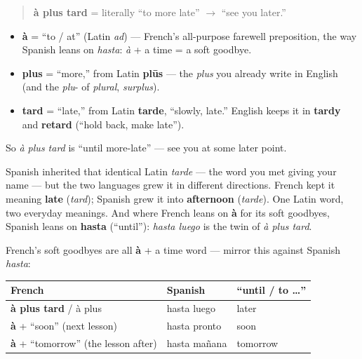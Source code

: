 \begin{cousinweb}
\begin{quote}
\textbf{à plus tard} = literally \textquotedblleft{}to more late\textquotedblright{} $\to$ \textquotedblleft{}see you later.\textquotedblright{}
\end{quote}

\begin{itemize}
\raggedright
  \item \textbf{à} = \textquotedblleft{}to / at\textquotedblright{} (Latin \emph{ad}) — French's all-purpose farewell preposition, the way Spanish leans on \emph{hasta}: \emph{à} + a time = a soft goodbye.
  \item \textbf{plus} = \textquotedblleft{}more,\textquotedblright{} from Latin \textbf{plūs} — the \emph{plus} you already write in English (and the \emph{plu}- of \emph{plural}, \emph{surplus}).
  \item \textbf{tard} = \textquotedblleft{}late,\textquotedblright{} from Latin \textbf{tarde}, \textquotedblleft{}slowly, late.\textquotedblright{} English keeps it in \textbf{tardy} and \textbf{retard} (\textquotedblleft{}hold back, make late\textquotedblright{}).
\end{itemize}

So \emph{à plus tard} is \textquotedblleft{}until more-late\textquotedblright{} — see you at some later point.
\end{cousinweb}

\begin{culture}
Spanish inherited that identical Latin \emph{tarde} — the word you met giving your name — but the two languages grew it in different directions. French kept it meaning \textbf{late} (\emph{tard}); Spanish grew it into \textbf{afternoon} (\emph{tarde}). One Latin word, two everyday meanings. And where French leans on \textbf{à} for its soft goodbyes, Spanish leans on \textbf{hasta} (\textquotedblleft{}until\textquotedblright{}): \emph{hasta luego} is the twin of \emph{à plus tard}.
\end{culture}

\begin{grammarlens}[title={Grammar Lens: the \textquotedblleft{}à …\textquotedblright{} farewells}]
French's soft goodbyes are all \textbf{à} + a time word — mirror this against Spanish \emph{hasta}:

\noindent
\begin{tabularx}{\linewidth}{@{}>{\raggedright\arraybackslash}X>{\raggedright\arraybackslash}X>{\raggedright\arraybackslash}X@{}}
\toprule
\textbf{French} & \textbf{Spanish} & \textbf{\textquotedblleft{}until / to …\textquotedblright{}} \\
\midrule
\textbf{à plus tard} / à plus & hasta luego & later \\
\textbf{à} + \textquotedblleft{}soon\textquotedblright{} (next lesson) & hasta pronto & soon \\
\textbf{à} + \textquotedblleft{}tomorrow\textquotedblright{} (the lesson after) & hasta mañana & tomorrow \\
\bottomrule
\end{tabularx}
\end{grammarlens}

